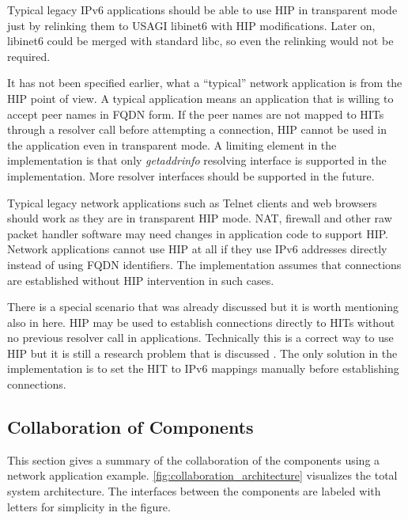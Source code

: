 Typical legacy IPv6 applications should be able to use HIP in
transparent mode just by relinking them to USAGI libinet6 with HIP
modifications. Later on, libinet6 could be merged with standard libc,
so even the relinking would not be required.

It has not been specified earlier, what a ``typical'' network
application is from the HIP point of view. A typical application means
an application that is willing to accept peer names in FQDN form. If
the peer names are not mapped to HITs through a resolver call before
attempting a connection, HIP cannot be used in the application even in
transparent mode.  A limiting element in the implementation is that
only \textit{getaddrinfo} resolving interface is supported in the
implementation. More resolver interfaces should be supported in the
future.

Typical legacy network applications such as Telnet clients and web
browsers should work as they are in transparent HIP mode. NAT,
firewall \cite{hiparch} and other raw packet handler software may need
changes in application code to support HIP. Network applications
cannot use HIP at all if they use IPv6 addresses directly instead of
using FQDN identifiers. The implementation assumes that connections
are established without HIP intervention in such cases.

There is a special scenario that was already discussed
 but it is worth mentioning also in
here. HIP may be used to establish connections directly to HITs
without no previous resolver call in applications. Technically this is
a correct way to use HIP but it is still a research problem that is
discussed . The only solution in the
implementation is to set the HIT to IPv6 mappings manually before
establishing connections.

\subsection{Collaboration of Components}
\label{sec:collaboration_of_architecture_components}


This section gives a summary of the collaboration of the components
using a network application example.
\autoref{fig:collaboration_architecture} visualizes the total system
architecture. The interfaces between the components are labeled with
letters for simplicity in the figure.

